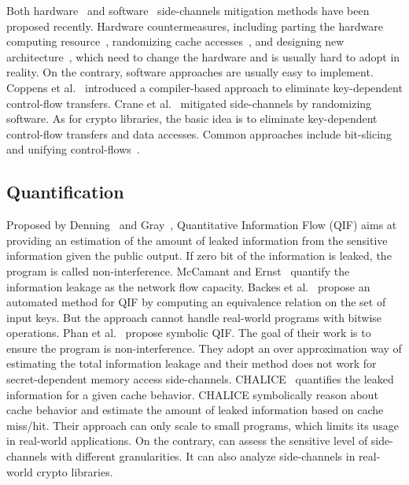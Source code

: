 Both hardware~\cite{Page2005PartitionedCA,
Wang:2007:NCD:1250662.1250723,Zhang:2015:HDL:2775054.2694372,Li:2014:SLH:2541940.2541947,
236344} and software~\cite{shih2017t,Coppens:2009:PMT:1607723.1608124,
brickell2006software,crane2015thwarting} side-channels mitigation methods have
been proposed recently. Hardware countermeasures, including parting the hardware
computing resource~\cite{Page2005PartitionedCA}, randomizing cache
accesses~\cite{Wang:2007:NCD:1250662.1250723, 236344}, and designing new
architecture~\cite{tiwari2011crafting}, which need to change the hardware and is
usually hard to adopt in reality. On the contrary, software approaches are
usually easy to implement. Coppens et
al.~\cite{Coppens:2009:PMT:1607723.1608124} introduced a compiler-based approach
to eliminate key-dependent control-flow transfers. Crane et
al.~\cite{crane2015thwarting} mitigated side-channels by randomizing software.
As for crypto libraries, the basic idea is to eliminate key-dependent
control-flow transfers and data accesses. Common approaches include
bit-slicing~\cite{konighofer2008fast,rebeiro2006bitslice} and unifying
control-flows~\cite{Coppens:2009:PMT:1607723.1608124}.

\subsection{Quantification}

Proposed by Denning~\cite{robling1982cryptography} and Gray~\cite{gray1992toward}, 
Quantitative Information Flow (QIF) aims at providing an estimation of the amount of leaked
information from the sensitive information given the public output. If zero bit
of the information is leaked, the program is called non-interference. McCamant
and Ernst~\cite{McCamantE2008} quantify the information leakage as the network
flow capacity. Backes et al.~\cite{5207642} propose an automated method for QIF
by computing an equivalence relation on the set of input keys. But the approach
cannot handle real-world programs with bitwise operations. 
Phan et
al.~\cite{Phan:2012:SQI:2382756.2382791} propose symbolic QIF. The goal of their
work is to ensure the program is non-interference. They adopt an over
approximation way of estimating the total information leakage and their method
does not work for secret-dependent memory access side-channels.
CHALICE~\cite{Chattopadhyay:2017:QIL:3127041.3127044} quantifies the leaked
information for a given cache behavior. CHALICE symbolically reason about cache
behavior and estimate the amount of leaked information based on cache miss/hit.
Their approach can only scale to small programs, which limits its usage in
real-world applications. On the contrary, \tool{} can assess the sensitive level
of side-channels with different granularities. It can also analyze side-channels
in real-world crypto libraries.

